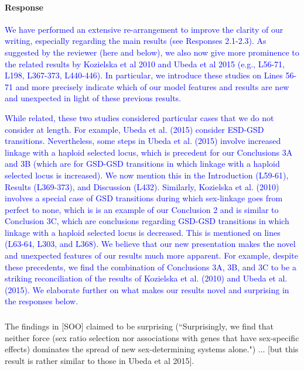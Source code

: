 \documentclass[10pt,letterpaper]{article}
\begin{document}
\noindent\paragraph{Response}
\textcolor{blue}{
We have performed an extensive re-arrangement to improve the clarity of our writing, especially regarding the main results (see Responses 2.1-2.3). 
As suggested by the reviewer (here and below), we also now give more prominence to the related results by Kozielska et al 2010 and Ubeda et al 2015 (e.g., L56-71, L198, L367-373, L440-446). 
In particular, we introduce these studies on Lines 56-71 and more precisely indicate which of our model features and results are new and unexpected in light of these previous results.
}

\textcolor{blue}{
While related, these two studies considered particular cases that we do not consider at length. 
For example, Ubeda et al. (2015) consider ESD-GSD transitions. 
Nevertheless, some steps in Ubeda et al. (2015) involve increased linkage with a haploid selected locus, which is precedent for our Conclusions 3A and 3B (which are for GSD-GSD transitions in which linkage with a haploid selected locus is increased).
We now mention this in the Introduction (L59-61), Results (L369-373), and Discussion (L432).  
Similarly, Kozielska et al. (2010) involves a special case of GSD transitions during which sex-linkage goes from perfect to none, which is is an example of our Conclusion 2 and is similar to Conclusion 3C, which are conclusions regarding GSD-GSD transitions in which linkage with a haploid selected locus is decreased.
This is mentioned on lines (L63-64, L303, and L368). 
We believe that our new presentation makes the novel and unexpected features of our results much more apparent. 
For example, despite these precedents, we find the combination of Conclusions 3A, 3B, and 3C to be a striking reconciliation of the results of Kozielska et al. (2010) and Ubeda et al. (2015). 
We elaborate further on what makes our results novel and surprising in the responses below.
}

\noindent\subsubsection{}
The findings in [SOO] claimed to be surprising (``Surprisingly, we find that neither force (sex ratio selection nor associations with genes that have sex-specific effects) dominates the spread of new sex-determining systems alone.") ... [but this result is rather similar to those in Ubeda et al 2015]. 
\end{document}
